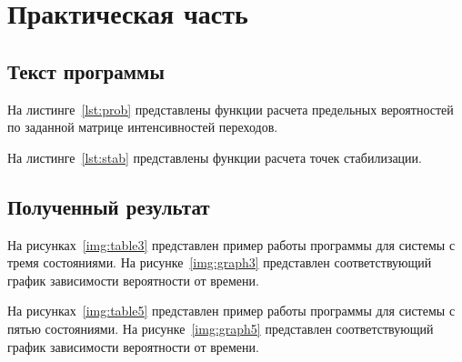 \chapter{Практическая часть}

\section{Текст программы}

На листинге~\ref{lst:prob} представлены функции расчета предельных вероятностей
по заданной матрице интенсивностей переходов.

{
\captionsetup{format=hang,justification=raggedright,
              singlelinecheck=off,width=16cm}

На листинге~\ref{lst:stab} представлены функции расчета точек стабилизации.

}

\clearpage
\section{Полученный результат}

На рисунках~\ref{img:table3} представлен пример работы программы для системы с
тремя состояниями. На рисунке~\ref{img:graph3} представлен соответствующий график
зависимости вероятности от времени.



На рисунках~\ref{img:table5} представлен пример работы программы для системы с
пятью состояниями. На рисунке~\ref{img:graph5} представлен соответствующий график
зависимости вероятности от времени.


